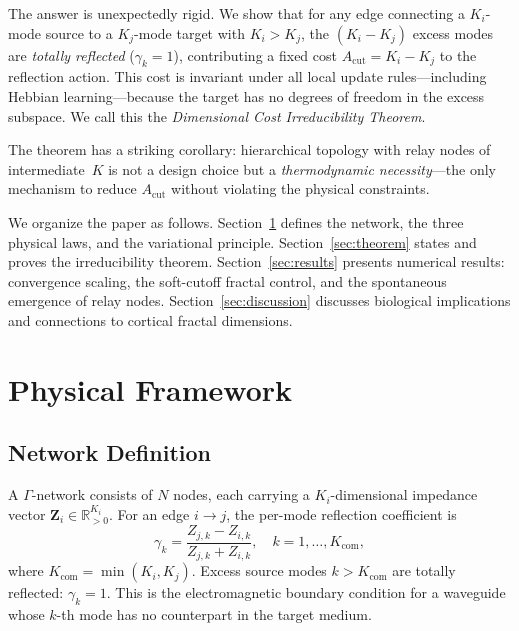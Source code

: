 \documentclass[aps,pre,twocolumn,superscriptaddress,floatfix]{revtex4-2}
\newcommand{\Acut}{A_{\text{cut}}}
\newcommand{\Kcom}{K_{\text{com}}}
\begin{document}
The answer is unexpectedly rigid.
We show that for any edge connecting a $K_i$-mode source to a
$K_j$-mode target with $K_i > K_j$,
the $(K_i - K_j)$ excess modes are \emph{totally reflected}
($\gamma_k = 1$), contributing a fixed cost
$\Acut = K_i - K_j$
to the reflection action.
This cost is invariant under all local update rules---including
Hebbian learning---because the target has no degrees of freedom
in the excess subspace.
We call this the \emph{Dimensional Cost Irreducibility Theorem}.

The theorem has a striking corollary:
hierarchical topology with relay nodes of intermediate~$K$ is not
a design choice but a \emph{thermodynamic necessity}---the only
mechanism to reduce $\Acut$ without violating the physical
constraints.

We organize the paper as follows.
Section~\ref{sec:framework} defines the network, the three physical
laws, and the variational principle.
Section~\ref{sec:theorem} states and proves the irreducibility theorem.
Section~\ref{sec:results} presents numerical results:
convergence scaling, the soft-cutoff fractal control, and the
spontaneous emergence of relay nodes.
Section~\ref{sec:discussion} discusses biological implications
and connections to cortical fractal dimensions.

\section{Physical Framework}
\label{sec:framework}

\subsection{Network Definition}

A $\Gamma$-network consists of $N$ nodes,
each carrying a $K_i$-dimensional impedance vector
$\mathbf{Z}_i \in \mathbb{R}^{K_i}_{>0}$.
For an edge $i \to j$, the per-mode reflection coefficient is
\begin{equation}
\gamma_k = \frac{Z_{j,k} - Z_{i,k}}{Z_{j,k} + Z_{i,k}},
\quad k = 1, \ldots, \Kcom,
\label{eq:gamma}
\end{equation}
where $\Kcom = \min(K_i, K_j)$.
Excess source modes $k > \Kcom$ are totally reflected:
$\gamma_k = 1$.
This is the electromagnetic boundary condition for a waveguide
whose $k$-th mode has no counterpart in the target medium.
\end{document}
